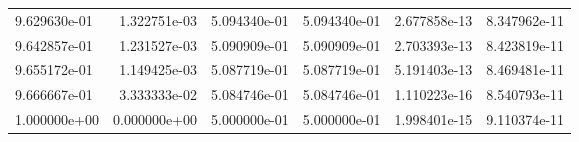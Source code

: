 \begin{tabular}{lrrrrr}
9.629630e-01 & 1.322751e-03 & 5.094340e-01 & 5.094340e-01 & 2.677858e-13 & 8.347962e-11 \\
9.642857e-01 & 1.231527e-03 & 5.090909e-01 & 5.090909e-01 & 2.703393e-13 & 8.423819e-11 \\
9.655172e-01 & 1.149425e-03 & 5.087719e-01 & 5.087719e-01 & 5.191403e-13 & 8.469481e-11 \\
9.666667e-01 & 3.333333e-02 & 5.084746e-01 & 5.084746e-01 & 1.110223e-16 & 8.540793e-11 \\
1.000000e+00 & 0.000000e+00 & 5.000000e-01 & 5.000000e-01 & 1.998401e-15 & 9.110374e-11 \\
\bottomrule
\end{tabular}
